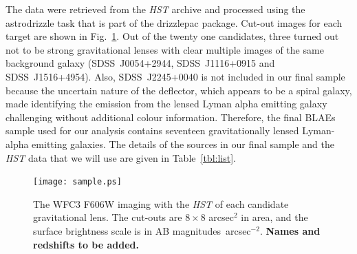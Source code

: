 \documentclass[a4paper,fleqn,usenatbib]{mnras}
\begin{document}
The data were retrieved from the {\it HST} archive and processed using the {\sc astrodrizzle} task that is part of the {\sc drizzlepac} package. Cut-out images for each target are shown in Fig.~\ref{fig:sample}. Out of the twenty one candidates, three turned out not to be strong gravitational lenses with clear multiple images of the same background galaxy (SDSS~J0054+2944, SDSS~J1116+0915 and SDSS~J1516+4954). Also, SDSS~J2245+0040 is not included in our final sample because the uncertain nature of the deflector, which appears to be a spiral galaxy, made identifying the emission from the lensed Lyman alpha emitting galaxy challenging without additional colour information. Therefore, the final BLAEs sample used for our analysis contains seventeen gravitationally lensed Lyman-alpha emitting galaxies. The details of the sources in our final sample and the {\it HST} data that we will use are given in Table~\ref{tbl:list}.

\begin{figure}
\begin{center} 
\texttt{[image: sample.ps]}
\caption{The WFC3 F606W imaging with the {\it HST} of each candidate gravitational lens. The cut-outs are $8\times8$ arcsec$^2$ in area, and the surface brightness scale is in AB magnitudes~arcsec$^{-2}$. {\bf Names and redshifts to be added.}}
\label{fig:sample}
\end{center}     
 \end{figure}


\end{document}
